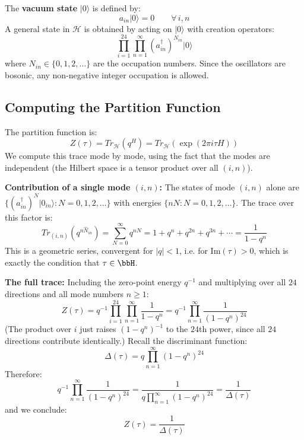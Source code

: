 The \textbf{vacuum state} $|0\rangle$ is defined by:
\begin{equation}
    a_{in}|0\rangle = 0 \qquad \forall\, i,n
\end{equation}
A general state in $\mathcal{H}$ is obtained by acting on $|0\rangle$ with 
creation operators:
\begin{equation}
    \prod_{i=1}^{24}\prod_{n=1}^{\infty} (a^\dagger_{in})^{N_{in}} |0\rangle
\end{equation}
where $N_{in} \in \{0,1,2,\ldots\}$ are the occupation numbers. Since the 
oscillators are bosonic, any non-negative integer occupation is allowed.

\subsection{Computing the Partition Function} \label{app:Partition_Function}

The partition function is:
\begin{equation}
    Z(\tau) = Tr_{\mathcal{H}}\left(q^H\right) 
    = Tr_{\mathcal{H}}\left(\exp\!\left(2\pi i\tau H\right)\right)
\end{equation}
We compute this trace mode by mode, using the fact that the modes are 
independent (the Hilbert space is a tensor product over all $(i,n)$).

\textbf{Contribution of a single mode $(i,n)$:} The states of mode $(i,n)$ 
alone are $\{(a^\dagger_{in})^N|0_{in}\rangle : N = 0,1,2,\ldots\}$ with 
energies $\{nN : N = 0,1,2,\ldots\}$. The trace over this factor is:
\begin{equation}
    Tr_{(i,n)}\left(q^{n\hat{N}_{in}}\right) 
    = \sum_{N=0}^{\infty} q^{nN} 
    = 1 + q^n + q^{2n} + q^{3n} + \cdots 
    = \frac{1}{1-q^n}
\end{equation}
This is a geometric series, convergent for $|q| < 1$, i.e. for 
$\text{Im}(\tau) > 0$, which is exactly the condition that $\tau \in \bbH$.

\textbf{The full trace:} Including the zero-point energy $q^{-1}$ and 
multiplying over all $24$ directions and all mode numbers $n \geq 1$:
\begin{equation}
    Z(\tau) = q^{-1} \prod_{i=1}^{24}\prod_{n=1}^{\infty}\frac{1}{1-q^n}
    = q^{-1}\prod_{n=1}^{\infty}\frac{1}{(1-q^n)^{24}}
\end{equation}
(The product over $i$ just raises $(1-q^n)^{-1}$ to the $24$th power, 
since all $24$ directions contribute identically.)
Recall the discriminant function:
\begin{equation}
    \Delta(\tau) = q\prod_{n=1}^{\infty}(1-q^n)^{24}
\end{equation}
Therefore:
\begin{equation}
    q^{-1}\prod_{n=1}^{\infty}\frac{1}{(1-q^n)^{24}} 
    = \frac{1}{q\prod_{n=1}^{\infty}(1-q^n)^{24}}
    = \frac{1}{\Delta(\tau)}
\end{equation}
and we conclude:
\begin{equation}\label{Z=1/Delta}
    \boxed{Z(\tau) = \frac{1}{\Delta(\tau)}}
\end{equation}


